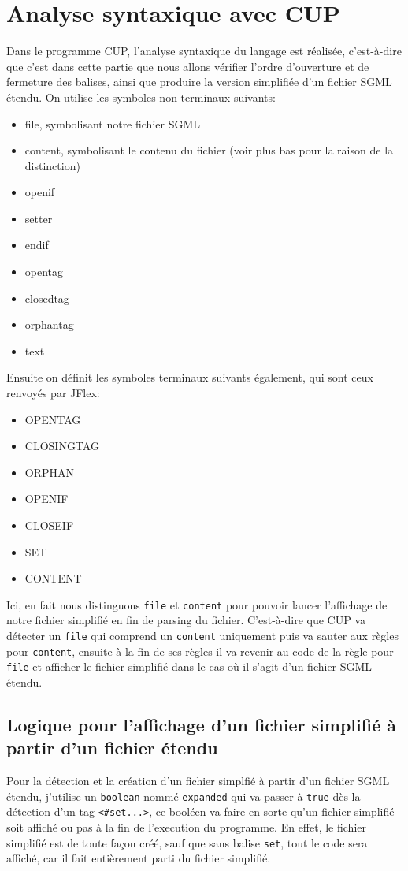 \documentclass[a4paper]{article}
\begin{document}
\section{Analyse syntaxique avec CUP}
Dans le programme CUP, l'analyse syntaxique du langage est réalisée, c'est-à-dire que c'est dans cette partie que nous allons vérifier l'ordre d'ouverture et de fermeture des balises, ainsi que produire la version simplifiée d'un fichier SGML étendu.
On utilise les symboles non terminaux suivants:
\begin{itemize}
	\item file, symbolisant notre fichier SGML
	\item content, symbolisant le contenu du fichier (voir plus bas pour la raison de la distinction)
	\item openif
	\item setter
	\item endif
	\item opentag
	\item closedtag
	\item orphantag
	\item text
\end{itemize}
Ensuite on définit les symboles terminaux suivants également, qui sont ceux renvoyés par JFlex:
\begin{itemize}
	\item OPENTAG
	\item CLOSINGTAG
	\item ORPHAN
	\item OPENIF
	\item CLOSEIF
	\item SET
	\item CONTENT \\
\end{itemize}

Ici, en fait nous distinguons \verb+file+ et \verb+content+ pour pouvoir lancer l'affichage de notre fichier simplifié en fin de parsing du fichier. C'est-à-dire que CUP va détecter un \verb+file+ qui comprend un \verb+content+ uniquement puis va sauter aux règles pour \verb+content+, ensuite à la fin de ses règles il va revenir au code de la règle pour \verb+file+ et afficher le fichier simplifié dans le cas où il s'agit d'un fichier SGML étendu.

\subsection{Logique pour l'affichage d'un fichier simplifié à partir d'un fichier étendu}
Pour la détection et la création d'un fichier simplfié à partir d'un fichier SGML étendu, j'utilise un \verb`boolean` nommé \verb`expanded` qui va passer à \verb+true+ dès la détection d'un tag \verb+<#set...>+, ce booléen va faire en sorte qu'un fichier simplifié soit affiché ou pas à la fin de l'execution du programme. En effet, le fichier simplifié est de toute façon créé, sauf que sans balise \verb+set+, tout le code sera affiché, car il fait entièrement parti du fichier simplifié. \\
\end{document}

